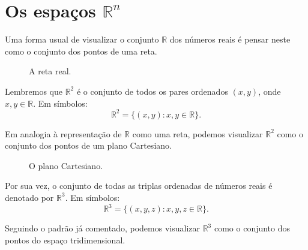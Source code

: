 \section{Os espaços $\mathbb R^n$}

Uma forma usual de visualizar o conjunto $\mathbb R$ dos números reais é pensar neste como o conjunto dos pontos de uma reta.
\begin{figure}[ht]
    \centering
    \caption{A reta real.}
\end{figure}

Lembremos que $\mathbb R^2$ é o conjunto de todos os pares ordenados $(x, y)$, onde $x, y \in \mathbb R$.
Em símbolos:
\begin{equation*}
    \mathbb R^2 = \{(x, y) : x, y \in \mathbb R\}.
\end{equation*}

Em analogia à representação de $\mathbb R$ como uma reta, podemos visualizar $\mathbb R^2$ como o conjunto dos pontos de um plano Cartesiano.
\begin{figure}[ht]
    \centering
    \caption{O plano Cartesiano.}
\end{figure}

Por sua vez, o conjunto de todas as triplas ordenadas de números reais é denotado por $\mathbb R^3$.
Em símbolos:
\begin{equation*}
    \mathbb R^3 = \{(x, y, z) : x, y, z \in \mathbb R\}.
\end{equation*}

Seguindo o padrão já comentado, podemos visualizar $\mathbb R^3$ como o conjunto dos pontos do espaço tridimensional.

